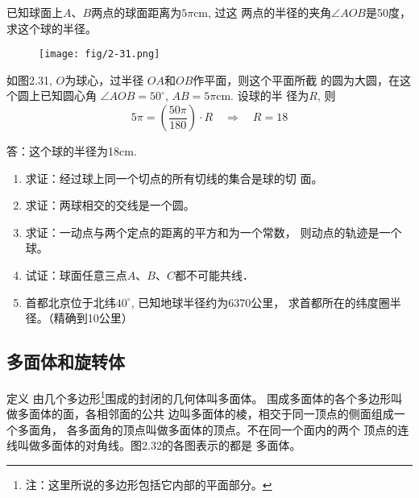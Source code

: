 \begin{example}
    已知球面上$A$、$B$两点的球面距离为$5\pi$cm, 过这
两点的半径的夹角$\angle AOB$是50度，求这个球的半径。
\end{example}

\begin{figure}[htp]
    \centering
\texttt{[image: fig/2-31.png]}
    \caption{}
\end{figure}


\begin{solution}
    如图2.31, $O$为球心，过半径
$OA$和$OB$作平面，则这个平面所截
的圆为大圆，在这个圆上已知圆心角
$\angle AOB=50^{\circ}$, $AB=5\pi$cm. 设球的半
径为$R$, 则
\[5\pi=\left(\frac{50\pi}{180}\right)\cdot R\quad \Rightarrow\quad R=18\]

答：这个球的半径为18cm.
\end{solution}

\begin{ex}
\begin{enumerate}
    \item 求证：经过球上同一个切点的所有切线的集合是球的切
    面。
    \item 求证：两球相交的交线是一个圆。
    \item 求证：一动点与两个定点的距离的平方和为一个常数，
    则动点的轨迹是一个球。
    \item 试证：球面任意三点$A$、$B$、$C$都不可能共线．
    \item 
    首都北京位于北纬$40^{\circ}$, 已知地球半径约为6370公里，
    求首都所在的纬度圈半径。（精确到10公里）
\end{enumerate}
\end{ex}

\subsection{多面体和旋转体}
\begin{blk}
{定义} 由几个多边形\footnote{注：这里所说的多边形包括它内部的平面部分。}围成的封闭的几何体叫多面体。
围成多面体的各个多边形叫做多面体的面，各相邻面的公共
边叫多面体的棱，相交于同一顶点的侧面组成一个多面角，
各多面角的顶点叫做多面体的顶点。不在同一个面内的两个
顶点的连线叫做多面体的对角线。图2.32的各图表示的都是
多面体。    
\end{blk}


